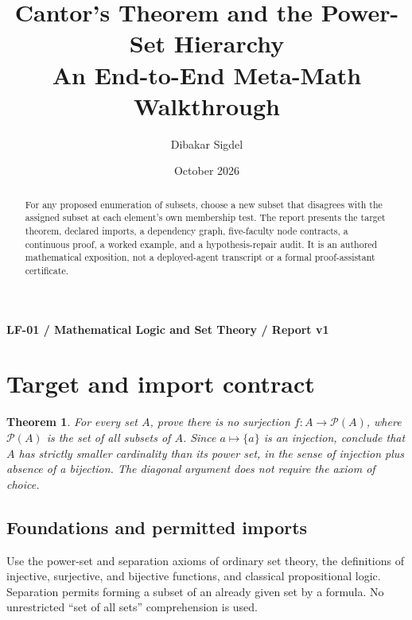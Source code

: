 \documentclass[preprint,12pt,aps,pra,showkeys,amsmath,amssymb,superscriptaddress,floatfix]{revtex4-2}
\newtheorem{theorem}{Theorem}[section]
\theoremstyle{definition}
\theoremstyle{remark}
\begin{document}
\title{Cantor's Theorem and the Power-Set Hierarchy\\[4pt]\large An End-to-End Meta-Math Walkthrough}

\author{Dibakar Sigdel}


\date{October 2026}

\begin{abstract}

For any proposed enumeration of subsets, choose a new subset that
disagrees with the assigned subset at each element's own membership
test. The report presents the target theorem, declared imports, a
dependency graph, five-faculty node contracts, a continuous proof, a
worked example, and a hypothesis-repair audit. It is an authored
mathematical exposition, not a deployed-agent transcript or a formal
proof-assistant certificate.

\end{abstract}\maketitle\linespread{1.12}\selectfont

\noindent\textbf{LF-01 / Mathematical Logic and Set Theory / Report v1}

\section{Target and import contract}

\begin{theorem}

For every set \(A\), prove there is no surjection
\(f:A\to\mathcal P(A)\), where \(\mathcal P(A)\) is the set of all
subsets of \(A\). Since \(a\mapsto\{a\}\) is an injection, conclude that
\(A\) has strictly smaller cardinality than its power set, in the sense
of injection plus absence of a bijection. The diagonal argument does not
require the axiom of choice.

\end{theorem}

\subsection{Foundations and permitted imports}

Use the power-set and separation axioms of ordinary set theory, the
definitions of injective, surjective, and bijective functions, and
classical propositional logic. Separation permits forming a subset of an
already given set by a formula. No unrestricted ``set of all sets''
comprehension is used.
\end{document}
